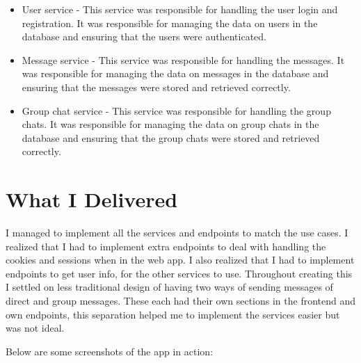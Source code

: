 \documentclass[12pt]{Article}
\begin{document}
\begin{itemize}
    \item User service - This service was responsible for handling the user login and registration. It was responsible for managing the data on users in the database and ensuring that the users were authenticated.
    \item Message service - This service was responsible for handling the messages. It was responsible for managing the data on messages in the database and ensuring that the messages were stored and retrieved correctly.
    \item Group chat service - This service was responsible for handling the group chats. It was responsible for managing the data on group chats in the database and ensuring that the group chats were stored and retrieved correctly.
\end{itemize}

\section{What I Delivered}
I managed to implement all the services and endpoints to match the use cases.
I realized that I had to implement extra endpoints to deal with handling the cookies and sessions when in the web app.
I also realized that I had to implement endpoints to get user info, for the other services to use.
Throughout creating this I settled on less traditional design of having two ways of sending messages of direct and group messages.
These each had their own sections in the frontend and own endpoints, this separation helped me to implement the services easier but was not ideal.

Below are some screenshots of the app in action:
\end{document}
